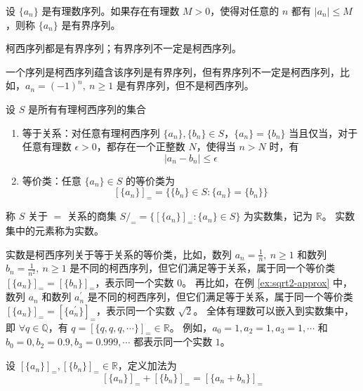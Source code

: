 \begin{definition}
    设 $\{a_n\}$ 是有理数序列。如果存在有理数 $M>0$，使得对任意的 $n$ 都有 $|a_n|\le M$，则称 $\{a_n\}$ 是有界序列。
\end{definition}

\begin{theorem}
    柯西序列都是有界序列；有界序列不一定是柯西序列。
\end{theorem}

\begin{note}
    一个序列是柯西序列蕴含该序列是有界序列，但有界序列不一定是柯西序列，比如，$a_n=(-1)^n,\ n\ge 1$ 是有界序列，但不是柯西序列。
\end{note}
\vspace{1em}

\begin{definition} 
    设 $S$ 是所有有理柯西序列的集合
    \begin{enumerate}
        \item 等于关系：对任意有理柯西序列 $\{a_n\},\{b_n\}\in S$，$\{a_n\} = \{b_n\}$ 当且仅当，对于任意有理数 $\epsilon>0$，都存在一个正整数 $N$，使得当 $n>N$ 时，有
        \[
            |a_n - b_n| \le \epsilon
        \] 
        \item 等价类：任意 $\{a_n\}\in S$ 的等价类为
        \[
            [\{a_n\}]_{=} = \{\{b_n\}\in S : \{a_n\} = \{b_n\}\}
        \]
    \end{enumerate}
    称 $S$ 关于 $=$ 关系的商集 $S/_{=}= \{[\{a_n\}]_{=} : \{a_n\}\in S\}$ 为实数集，记为 $\mathbb{R}$。
    实数集中的元素称为实数。
\end{definition}
\begin{note}
    实数是柯西序列关于等于关系的等价类，比如，数列 $a_n = \frac{1}{n},\ n\ge 1$ 和数列 $b_n = \frac{1}{n^2},\ n\ge 1$ 是不同的柯西序列，但它们满足等于关系，属于同一个等价类 $[\{a_n\}]_{=}=[\{b_n\}]_{=}$，表示同一个实数 $0$。
    再比如，在例 \ref{ex:sqrt2-approx} 中，数列 $a_n$ 和数列 $a_n^{\prime}$ 是不同的柯西序列，但它们满足等于关系，属于同一个等价类 $[\{a_n\}]_{=}=[\{a_n^{\prime}\}]_{=}$，表示同一个实数 $\sqrt{2}$。
    全体有理数可以嵌入到实数集中，即 $\forall q\in\mathbb{Q}$，有 $q = [\{q,q,q,\cdots\}]_{=}\in\mathbb{R}$。
    例如，$a_0=1,a_2=1,a_3=1,\cdots$ 和 $b_0=0,b_2=0.9,b_3=0.999,\cdots$ 都表示同一个实数 $1$。
\end{note}
\vspace{1em}

\begin{definition}
    设 $[\{a_n\}]_{=},[\{b_n\}]_{=}\in\mathbb{R}$，定义加法为
    \[
        [\{a_n\}]_{=} + [\{b_n\}]_{=} = [\{a_n+b_n\}]_{=}
    \]
\end{definition}


